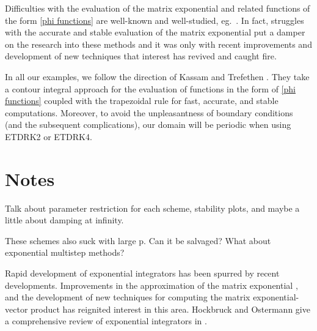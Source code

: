 Difficulties with the evaluation of the matrix exponential and related functions of the form \cref{phi functions} are well-known and well-studied, eg.\ \cite{moler2003nineteen,higham2002accuracy,higham2008functions,hochbruck1997krylov}. In fact, struggles with the accurate and stable evaluation of the matrix exponential put a damper on the research into these methods and it was only with recent improvements and development of new techniques \cite{hochbruck1997krylov,sidje1998expokit,kassam2005fourth,simoncini2007recent,higham2008functions} that interest has revived and caught fire.

In all our examples, we follow the direction of Kassam and Trefethen \cite{kassam2005fourth}. They take a contour integral approach for the evaluation of functions in the form of \cref{phi functions} coupled with the trapezoidal rule for fast, accurate, and stable computations. Moreover, to avoid the unpleasantness of boundary conditions (and the subsequent complications), our domain will be periodic when using ETDRK2 or ETDRK4.

\clearpage
\section{Notes}



Talk about parameter restriction for each scheme, stability plots, and maybe a little about damping at infinity.

These schemes also suck with large p. Can it be salvaged? What about exponential multistep methods? 


Rapid development of exponential integrators has been spurred by recent developments. Improvements in the approximation of the matrix exponential \cite{}, and the development of new techniques for computing the matrix exponential-vector product \cite{} has reignited interest in this area. Hockbruck and Ostermann give a comprehensive review of exponential integrators in \cite{hochbruck2010expintegrators}.

